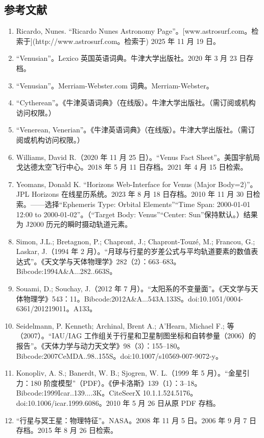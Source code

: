 \subsection{参考文献}
\begin{enumerate}
\item Ricardo, Nunes. “Ricardo Nunes Astronomy Page”。[www.astrosurf.com。检索于](http://www.astrosurf.com。检索于) 2025 年 11 月 19 日。
\item “Venusian”。Lexico 英国英语词典。牛津大学出版社。2020 年 3 月 23 日存档。
\item “Venusian”。Merriam-Webster.com 词典。Merriam-Webster。
\item “Cytherean”。《牛津英语词典》（在线版）。牛津大学出版社。（需订阅或机构访问权限。）
\item “Venerean, Venerian”。《牛津英语词典》（在线版）。牛津大学出版社。（需订阅或机构访问权限。）
\item Williams, David R.（2020 年 11 月 25 日）。“Venus Fact Sheet”。美国宇航局戈达德太空飞行中心。2018 年 5 月 11 日存档。2021 年 4 月 15 日检索。
\item Yeomans, Donald K. “Horizons Web-Interface for Venus (Major Body=2)”。JPL Horizons 在线星历系统。2023 年 8 月 18 日存档。2010 年 11 月 30 日检索。——选择“Ephemeris Type: Orbital Elements”“Time Span: 2000-01-01 12:00 to 2000-01-02”。（“Target Body: Venus”“Center: Sun”保持默认。）结果为 J2000 历元的瞬时摄动轨道元素。
\item Simon, J.L.; Bretagnon, P.; Chapront, J.; Chapront-Touzé, M.; Francou, G.; Laskar, J.（1994 年 2 月）。“月球与行星的岁差公式与平均轨道要素的数值表达式”。《天文学与天体物理学》282（2）：663–683。Bibcode:1994A&A...282..663S。
\item Souami, D.; Souchay, J.（2012 年 7 月）。“太阳系的不变量面”。《天文学与天体物理学》543：11。Bibcode:2012A&A...543A.133S。doi:10.1051/0004-6361/201219011。A133。
\item Seidelmann, P. Kenneth; Archinal, Brent A.; A'Hearn, Michael F.; 等（2007）。“IAU/IAG 工作组关于行星和卫星制图坐标和自转参量（2006）的报告”。《天体力学与动力天文学》98（3）：155–180。Bibcode:2007CeMDA..98..155S。doi:10.1007/s10569-007-9072-y。
\item Konopliv, A. S.; Banerdt, W. B.; Sjogren, W. L.（1999 年 5 月）。“金星引力：180 阶度模型”（PDF）。《伊卡洛斯》139（1）：3–18。Bibcode:1999Icar..139....3K。CiteSeerX 10.1.1.524.5176。doi:10.1006/icar.1999.6086。2010 年 5 月 26 日从原 PDF 存档。
\item “行星与冥王星：物理特征”。NASA。2008 年 11 月 5 日。2006 年 9 月 7 日存档。2015 年 8 月 26 日检索。

\end{enumerate}
